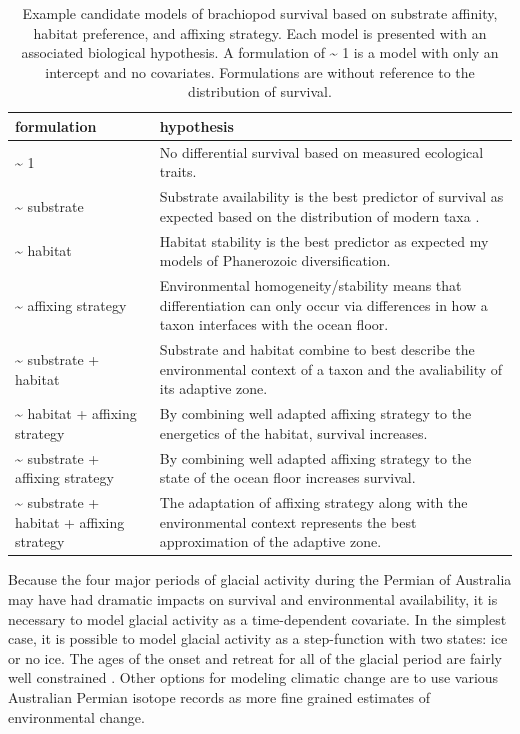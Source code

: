 \documentclass[12pt,letterpaper]{article}
\begin{document}
\begin{table}[ht]
  \centering
  \begin{tabular}{ l | p{7cm} }
    \hline
    formulation & hypothesis \\
    \hline
    \~{} 1 & No differential survival based on measured ecological traits. \\
    \~{} substrate & Substrate availability is the best predictor of survival as expected based on the distribution of modern taxa \citep{Richardson1997,Richardson1997a}. \\
    \~{} habitat & Habitat stability is the best predictor as expected my models of Phanerozoic diversification. \\
    \~{} affixing strategy & Environmental homogeneity/stability means that differentiation can only occur via differences in how a taxon interfaces with the ocean floor. \\
    \~{} substrate + habitat & Substrate and habitat combine to best describe the environmental context of a taxon and the avaliability of its adaptive zone. \\
    \~{} habitat + affixing strategy & By combining well adapted affixing strategy to the energetics of the habitat, survival increases. \\
    \~{} substrate + affixing strategy & By combining well adapted affixing strategy to the state of the ocean floor increases survival. \\
    \~{} substrate + habitat + affixing strategy & The adaptation of affixing strategy along with the environmental context represents the best approximation of the adaptive zone. \\
    \hline
  \end{tabular}
  \caption[Example models of brachiopod survival]{Example candidate models of brachiopod survival based on substrate affinity, habitat preference, and affixing strategy. Each model is presented with an associated biological hypothesis. A formulation of \~{} 1 is a model with only an intercept and no covariates. Formulations are without reference to the distribution of survival.}
  \label{tab:brac_surv_mod}
\end{table}

Because the four major periods of glacial activity during the Permian of Australia may have had dramatic impacts on survival and environmental availability, it is necessary to model glacial activity as a time-dependent covariate. In the simplest case, it is possible to model glacial activity as a step-function with two states: ice or no ice. The ages of the onset and retreat for all of the glacial period are fairly well constrained \citep{Fielding2008,Fielding2008a}. Other options for modeling climatic change are to use various Australian Permian isotope records \citep{Birgenheier2010} as more fine grained estimates of environmental change. 
\end{document}
